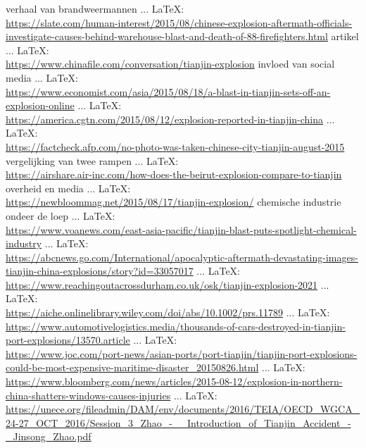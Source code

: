 \begin{thebibliography}{99}
verhaal van brandweermannen
 ... \LaTeX:\\ \url{https://slate.com/human-interest/2015/08/chinese-explosion-aftermath-officials-investigate-causes-behind-warehouse-blast-and-death-of-88-firefighters.html}
artikel
 ... \LaTeX:\\ \url{https://www.chinafile.com/conversation/tianjin-explosion}
invloed van social media
 ... \LaTeX:\\ \url{https://www.economist.com/asia/2015/08/18/a-blast-in-tianjin-sets-off-an-explosion-online}
 ... \LaTeX:\\ \url{https://america.cgtn.com/2015/08/12/explosion-reported-in-tianjin-china}
 ... \LaTeX:\\ \url{https://factcheck.afp.com/no-photo-was-taken-chinese-city-tianjin-august-2015}
vergelijking van twee rampen
 ... \LaTeX:\\ \url{https://airshare.air-inc.com/how-does-the-beirut-explosion-compare-to-tianjin}
overheid en media
 ... \LaTeX:\\ \url{https://newbloommag.net/2015/08/17/tianjin-explosion/}
chemische industrie ondeer de loep
 ... \LaTeX:\\ \url{https://www.voanews.com/east-asia-pacific/tianjin-blast-puts-spotlight-chemical-industry}
 ... \LaTeX:\\ \url{https://abcnews.go.com/International/apocalyptic-aftermath-devastating-images-tianjin-china-explosions/story?id=33057017}
 ... \LaTeX:\\ \url{https://www.reachingoutacrossdurham.co.uk/osk/tianjin-explosion-2021}
 ... \LaTeX:\\ \url{https://aiche.onlinelibrary.wiley.com/doi/abs/10.1002/prs.11789}
 ... \LaTeX:\\ \url{https://www.automotivelogistics.media/thousands-of-cars-destroyed-in-tianjin-port-explosions/13570.article}
 ... \LaTeX:\\ \url{https://www.joc.com/port-news/asian-ports/port-tianjin/tianjin-port-explosions-could-be-most-expensive-maritime-disaster_20150826.html}
 ... \LaTeX:\\ \url{https://www.bloomberg.com/news/articles/2015-08-12/explosion-in-northern-china-shatters-windows-causes-injuries}
 ... \LaTeX:\\ \url{https://unece.org/fileadmin/DAM/env/documents/2016/TEIA/OECD_WGCA_24-27_OCT_2016/Session_3_Zhao_-__Introduction_of_Tianjin_Accident_-_Jinsong_Zhao.pdf}

\end{thebibliography}
